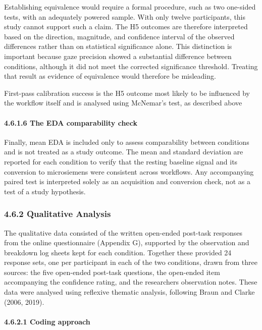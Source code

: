 \documentclass[
]{article}
\begin{document}
Establishing equivalence would require a formal procedure, such as two one-sided tests, with an adequately powered sample. With only twelve participants, this study cannot support such a claim. The H5 outcomes are therefore interpreted based on the direction, magnitude, and confidence interval of the observed differences rather than on statistical significance alone. This distinction is important because gaze precision showed a substantial difference between conditions, although it did not meet the corrected significance threshold. Treating that result as evidence of equivalence would therefore be misleading.

First-pass calibration success is the H5 outcome most likely to be influenced by the workflow itself and is analysed using McNemar's test, as described above

\hypertarget{the-eda-comparability-check}{%
\paragraph{4.6.1.6 The EDA comparability check}\label{the-eda-comparability-check}}

Finally, mean EDA is included only to assess comparability between conditions and is not treated as a study outcome. The mean and standard deviation are reported for each condition to verify that the resting baseline signal and its conversion to microsiemens were consistent across workflows. Any accompanying paired test is interpreted solely as an acquisition and conversion check, not as a test of a study hypothesis.

\hypertarget{qualitative-analysis}{%
\subsubsection{4.6.2 Qualitative Analysis}\label{qualitative-analysis}}

The qualitative data consisted of the written open-ended post-task responses from the online questionnaire (Appendix G), supported by the observation and breakdown log sheets kept for each condition. Together these provided 24 response sets, one per participant in each of the two conditions, drawn from three sources: the five open-ended post-task questions, the open-ended item accompanying the confidence rating, and the researcher\textquotesingle s observation notes. These data were analysed using reflexive thematic analysis, following Braun and Clarke (2006, 2019).

\hypertarget{coding-approach}{%
\paragraph{\texorpdfstring{4.6.2.1 Coding approach }{4.6.2.1 Coding approach }}\label{coding-approach}}
\end{document}
